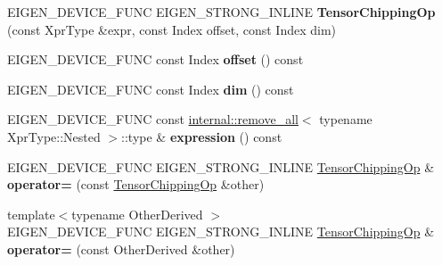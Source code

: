 \begin{DoxyCompactItemize}
\item 
\mbox{\label{class_eigen_1_1_tensor_chipping_op_a1b5be955865c0643dadd74ffb9049a92}} 
E\+I\+G\+E\+N\+\_\+\+D\+E\+V\+I\+C\+E\+\_\+\+F\+U\+NC E\+I\+G\+E\+N\+\_\+\+S\+T\+R\+O\+N\+G\+\_\+\+I\+N\+L\+I\+NE {\bfseries Tensor\+Chipping\+Op} (const Xpr\+Type \&expr, const Index offset, const Index dim)
\item 
\mbox{\label{class_eigen_1_1_tensor_chipping_op_aed0636c38b23074a14e8004962440432}} 
E\+I\+G\+E\+N\+\_\+\+D\+E\+V\+I\+C\+E\+\_\+\+F\+U\+NC const Index {\bfseries offset} () const
\item 
\mbox{\label{class_eigen_1_1_tensor_chipping_op_aed3aafff6855c514735744fb90617a63}} 
E\+I\+G\+E\+N\+\_\+\+D\+E\+V\+I\+C\+E\+\_\+\+F\+U\+NC const Index {\bfseries dim} () const
\item 
\mbox{\label{class_eigen_1_1_tensor_chipping_op_a470bf5eb8fe77d6143324c397cf9e42e}} 
E\+I\+G\+E\+N\+\_\+\+D\+E\+V\+I\+C\+E\+\_\+\+F\+U\+NC const \hyperlink{struct_eigen_1_1internal_1_1remove__all}{internal\+::remove\+\_\+all}$<$ typename Xpr\+Type\+::\+Nested $>$\+::type \& {\bfseries expression} () const
\item 
\mbox{\label{class_eigen_1_1_tensor_chipping_op_a84911d0e5ed2ff151a2965b659491949}} 
E\+I\+G\+E\+N\+\_\+\+D\+E\+V\+I\+C\+E\+\_\+\+F\+U\+NC E\+I\+G\+E\+N\+\_\+\+S\+T\+R\+O\+N\+G\+\_\+\+I\+N\+L\+I\+NE \hyperlink{class_eigen_1_1_tensor_chipping_op}{Tensor\+Chipping\+Op} \& {\bfseries operator=} (const \hyperlink{class_eigen_1_1_tensor_chipping_op}{Tensor\+Chipping\+Op} \&other)
\item 
\mbox{\label{class_eigen_1_1_tensor_chipping_op_a063f729e1afb4838b5bd28dfb460c777}} 
{\footnotesize template$<$typename Other\+Derived $>$ }\\E\+I\+G\+E\+N\+\_\+\+D\+E\+V\+I\+C\+E\+\_\+\+F\+U\+NC E\+I\+G\+E\+N\+\_\+\+S\+T\+R\+O\+N\+G\+\_\+\+I\+N\+L\+I\+NE \hyperlink{class_eigen_1_1_tensor_chipping_op}{Tensor\+Chipping\+Op} \& {\bfseries operator=} (const Other\+Derived \&other)
\end{DoxyCompactItemize}
